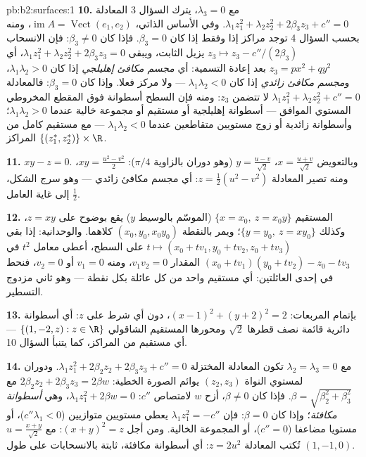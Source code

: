 \begin{solution}{pb:b2:surfaces:1}
\textbf{10.} مع $\lambda_3 = 0$، يترك السؤال 3 المعادلة $\lambda_1z_1^2 + \lambda_2z_2^2 + 2\beta_3z_3 + c'' = 0$. وفي الأساس
الذاتي، $\operatorname{im}A = \operatorname{Vect}(e_1,
e_2)$، ومنه بحسب السؤال 4 توجد مراكز إذا وفقط إذا كان
$\beta_3 = 0$. فإذا كان $\beta_3 \neq 0$: فإن الانسحاب $z_3 \mapsto z_3 -
c''/(2\beta_3)$ يزيل الثابت، ويبقى
$\lambda_1z_1^2
+ \lambda_2z_2^2 + 2\beta_3z_3 = 0$، أي $z_3 = px^2 +
qy^2$ بعد إعادة التسمية: أي \emph{مجسم مكافئ إهليلجي}
إذا كان $\lambda_1\lambda_2 > 0$، و\emph{مجسم مكافئ زائدي} إذا كان $\lambda_1\lambda_2 < 0$ --- ولا
مركز فعلا. وإذا كان $\beta_3 = 0$: فالمعادلة $\lambda_1z_1^2 + \lambda_2z_2^2 +
c'' = 0$ لا تتضمن $z_3$: ومنه
فإن السطح أسطوانة فوق المقطع المخروطي المستوي الموافق --- أسطوانة
إهليلجية أو مستقيم أو مجموعة خالية عندما $\lambda_1\lambda_2 > 0$؛ وأسطوانة زائدية
أو زوج مستويين متقاطعين عندما $\lambda_1\lambda_2 < 0$ --- مع مستقيم كامل من المراكز
$\{(z_1^*, z_2^*)\} \times \R$.

\textbf{11.} $xy - z = 0$. وبالتعويض $x = \frac{u +
v}{\sqrt2}$، $y = \frac{u - v}{\sqrt2}$ (وهو دوران بالزاوية
$\pi/4$): $xy = \frac{u^2 - v^2}2$، ومنه تصير المعادلة $z =
\frac12(u^2 - v^2)$: أي مجسم مكافئ زائدي
--- وهو سرج الشكل، إلى غاية العامل $\frac12$.

\textbf{12.} المستقيم $\{x = x_0,\ z = x_0y\}$ (الموسّم بالوسيط $y$) يقع بوضوح على
$z = xy$، وكذلك $\{y = y_0,\ z =
xy_0\}$؛ ويمر بالنقطة $(x_0, y_0, x_0y_0)$ كلاهما.
والوحدانية: إذا بقي $t \mapsto (x_0 + tv_1, y_0 + tv_2, z_0 +
tv_3)$ على السطح، أعطى معامل $t^2$ في $(x_0
+ tv_1)(y_0 + tv_2) - z_0 - tv_3$
المقدار $v_1v_2 = 0$، ومنه $v_1 = 0$ أو $v_2 = 0$، فنحط في إحدى العائلتين:
أي مستقيم واحد من كل عائلة بكل نقطة --- وهو ثاني  مزدوج التسطير.

\textbf{13.} بإتمام المربعات: $(x - 1)^2 + (y + 2)^2 = 2$، دون أي شرط على $z$: أي
أسطوانة دائرية قائمة نصف قطرها $\sqrt2$ ومحورها المستقيم الشاقولي
$\{(1, -2, z) : z \in
\R\}$ --- أي مستقيم من المراكز، كما يتنبأ السؤال 10.

\textbf{14.} مع $\lambda_2 = \lambda_3 = 0$ تكون المعادلة المختزلة $\lambda_1z_1^2 + 2\beta_2z_2 + 2\beta_3z_3 + c''
= 0$. ودوران لمستوي
النواة $(z_2, z_3)$ يوائم الصورة الخطية: $2\beta_2z_2 + 2\beta_3z_3 = 2\beta w$ مع $\beta = \sqrt{\beta_2^2 + \beta_3^2}$. فإذا كان
$\beta \neq 0$، أزح $w$ لامتصاص $c''$: $\lambda_1z_1^2 + 2\beta w =
0$، وهي \emph{أسطوانة
مكافئة}؛ وإذا كان $\beta = 0$: فإن $\lambda_1z_1^2 = -c''$ يعطي مستويين متوازيين ($c''
\lambda_1 < 0$)،
أو مستويا مضاعفا ($c'' = 0$)، أو المجموعة الخالية. ومن أجل $(x + y)^2 = z$: مع
$u = \frac{x + y}{\sqrt2}$ تُكتب المعادلة $z = 2u^2$: أي أسطوانة مكافئة، ثابتة بالانسحابات
على طول $(1, -1, 0)$.


\end{solution}
